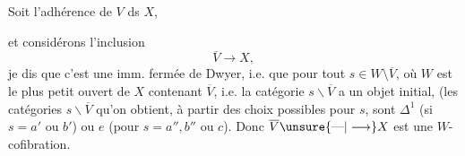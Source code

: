Soit
l’adhérence de $V$ ds $X$,


et considérons l’inclusion
\[
\overline V\longrightarrow X,
\]
je dis que c’est une imm. fermée de Dwyer, i.e. que pour tout $s\in W\setminus\overline V$, où $W$ est le plus petit ouvert de $X$ contenant $\overline V$, i.e.
la catégorie $s\backslash\overline V$ a un objet initial, (les catégories $s\backslash\overline V$ qu’on obtient, à partir des   choix possibles pour $s$, sont $\Delta^1$ (si $s=a'$ ou $b'$) ou $e$ (pour $s=a'',b''$ ou $c$). Donc $\overline V\unsure{\text{---}|\longrightarrow}X$ est une $W$-cofibration.

